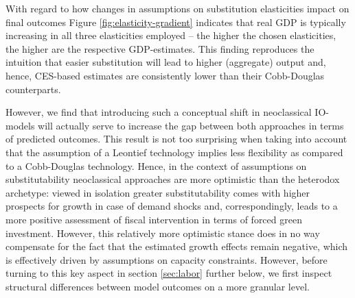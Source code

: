 
With regard to how changes in assumptions on substitution elasticities impact on final outcomes Figure \ref{fig:elasticity-gradient} indicates that real GDP is typically increasing in all three elasticities employed -- the higher the chosen elasticities, the higher are the respective GDP-estimates. This finding reproduces the intuition that easier substitution will lead to higher (aggregate) output and, hence, CES-based estimates are consistently lower than their Cobb-Douglas counterparts.


However, we find that introducing such a conceptual shift in neoclassical IO-models will actually serve to increase the gap between both approaches in terms of predicted outcomes. This result is not too surprising when taking into account that the assumption of a Leontief technology implies less flexibility as compared to a Cobb-Douglas technology. Hence, in the context of assumptions on substitutability neoclassical approaches are more optimistic than the heterodox archetype: viewed in isolation greater substitutability comes with higher prospects for growth in case of demand shocks and, correspondingly, leads to a more positive assessment of fiscal intervention in terms of forced green investment. However, this relatively more optimistic stance does in no way compensate for the fact that the estimated growth effects remain negative, which is effectively driven by assumptions on capacity constraints. However, before turning to this key aspect in section \ref{sec:labor} further below, we first inspect structural differences between model outcomes on a more granular level.


